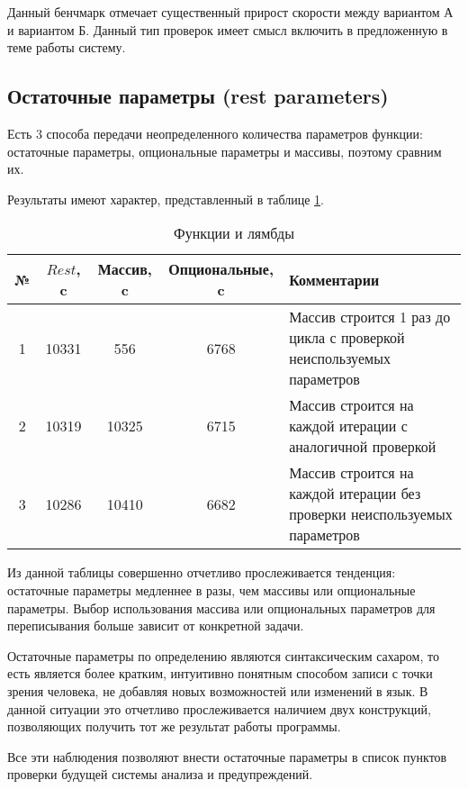 \documentclass{mipt-thesis-bs}
\begin{document}
Данный бенчмарк отмечает существенный прирост скорости между вариантом
А и вариантом Б. Данный тип проверок имеет смысл включить
в предложенную в теме работы систему.

\subsection{Остаточные параметры (rest parameters)}

Есть 3 способа передачи неопределенного количества параметров функции:
остаточные параметры, опциональные параметры и массивы, поэтому сравним их.

Результаты имеют характер, представленный в таблице \ref{tab:example}.

\begin{table}[h]
    \centering
    \begin{tabularx}{\textwidth}{|c|c|c|c|X|}
      \hline
      № & $Rest$, c & Массив, c & Опциональные, c & Комментарии \\
      \hline
      1 & 10331 & 556 & 6768 & Массив строится 1 раз до цикла с проверкой неиспользуемых параметров \\
      \hline
      2 & 10319 & 10325 & 6715 & Массив строится на каждой итерации с аналогичной проверкой\\
      \hline
      3 & 10286 & 10410 & 6682 & Массив строится на каждой итерации без проверки неиспользуемых параметров\\
      \hline
    \end{tabularx}
    \caption{Функции и лямбды}
    \label{tab:example}
  \end{table}



Из данной таблицы совершенно отчетливо прослеживается тенденция:
остаточные параметры медленнее в разы, чем массивы или опциональные параметры.
Выбор использования массива или опциональных параметров для переписывания больше
зависит от конкретной задачи.

Остаточные параметры по определению являются синтаксическим сахаром, то есть является
более кратким, интуитивно понятным способом записи с точки зрения человека, не добавляя
новых возможностей или изменений в язык. В данной ситуации это отчетливо прослеживается
наличием двух конструкций, позволяющих получить тот же результат работы программы.

Все эти наблюдения позволяют внести остаточные параметры в список пунктов проверки
будущей системы анализа и предупреждений.
\end{document}

